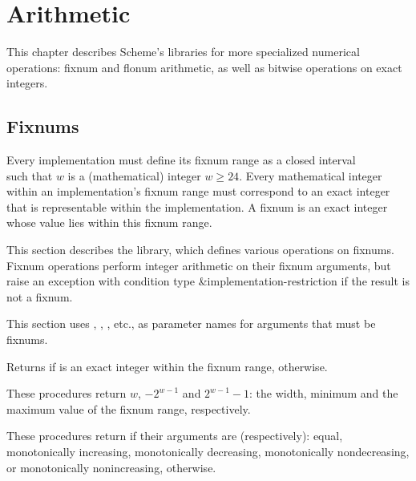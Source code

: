 \chapter{Arithmetic}
\label{numberchapter}

This chapter describes Scheme's libraries for more specialized
numerical operations: fixnum and flonum arithmetic, as well as bitwise
operations on exact integers.

\section{Fixnums}
\label{fixnumssection}

Every implementation must define its fixnum range as a closed
interval
%
\begin{displaymath}
[-2^{w-1}, 2^{w-1} - 1]
\end{displaymath}
%
such that $w$ is a (mathematical) integer $w \geq 24$.  Every
mathematical integer within an implementation's fixnum range must
correspond to an exact integer that is representable within the
implementation.
A fixnum is an exact integer whose value lies within this
fixnum range.

This section describes the  library,
which defines various operations on fixnums.
Fixnum operations perform integer arithmetic on their fixnum
arguments, but raise an exception with condition type
{\cf\&implementation-restriction} if the result is not a fixnum.

This section uses , , , etc., as parameter
names for arguments that must be fixnums.

\begin{entry}{%
}

Returns \schtrue{} if  is an exact
integer within the fixnum range, \schfalse{} otherwise.
\end{entry}

\begin{entry}{%
}

These procedures return $w$,
$-2^{w-1}$ and $2^{w-1} - 1$: the
width, minimum and the maximum value of the fixnum range, respectively.
\end{entry}

\begin{entry}{%
}

These procedures return \schtrue{} if their arguments are (respectively):
equal, monotonically increasing, monotonically decreasing,
monotonically nondecreasing, or monotonically nonincreasing,
\schfalse{} otherwise.
\end{entry}

